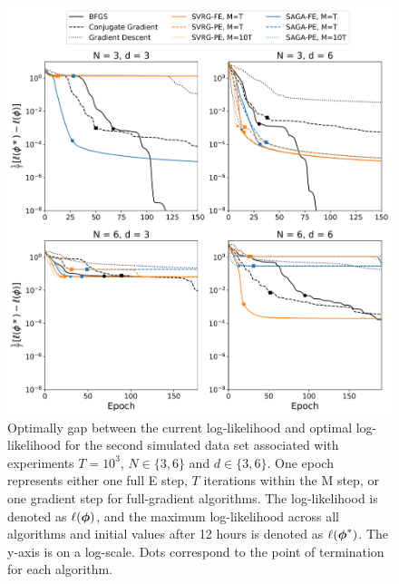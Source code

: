 \documentclass[12pt]{article}
\begin{document}
\begin{figure}[H]
    \centering
    \includegraphics[width=6.5in]{../plt/log-like_v_epoch_T-1000-001.png}
    \caption{Optimally gap between the current log-likelihood and optimal log-likelihood for the second simulated data set associated with experiments $T=10^{3}$, $N \in \{3,6\}$ and $d \in \{3,6\}$. One epoch represents either one full E step, $T$ iterations within the M step, or one gradient step for full-gradient algorithms. The log-likelihood is denoted as $\ell(\boldsymbol{\phi})$, and the maximum log-likelihood across all algorithms and initial values after 12 hours is denoted as $\ell(\boldsymbol{\phi}^*)$. The y-axis is on a log-scale. Dots correspond to the point of termination for each algorithm.}
\end{figure}
%
\end{document}
